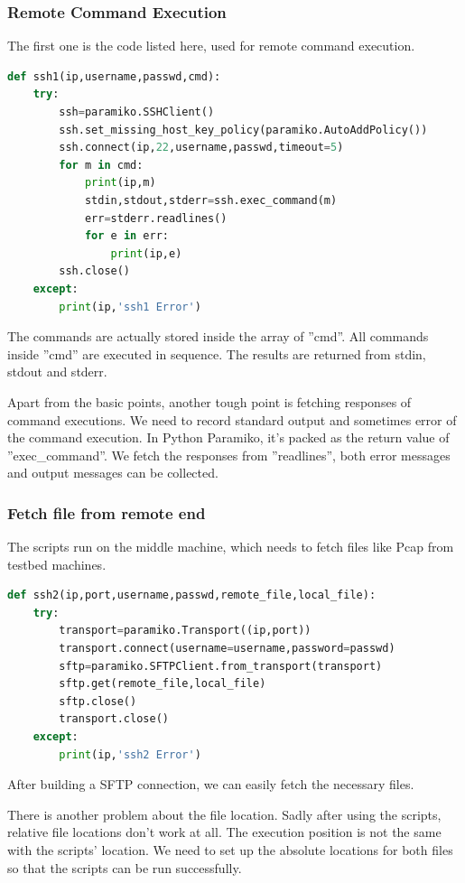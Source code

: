 \documentclass[12pt,a4paper]{article}
\begin{document}
\subsubsection{Remote Command Execution}
The first one is the code listed here, used for remote command execution.

\begin{lstlisting}[language=Python]
def ssh1(ip,username,passwd,cmd):
    try:
        ssh=paramiko.SSHClient()
        ssh.set_missing_host_key_policy(paramiko.AutoAddPolicy())
        ssh.connect(ip,22,username,passwd,timeout=5)
        for m in cmd:
            print(ip,m)
            stdin,stdout,stderr=ssh.exec_command(m)
            err=stderr.readlines()
            for e in err:
                print(ip,e)
        ssh.close()
    except:
        print(ip,'ssh1 Error')
\end{lstlisting}

The commands are actually stored inside the array of ''cmd''.
All commands inside ''cmd'' are executed in sequence.
The results are returned from stdin, stdout and stderr.

Apart from the basic points, another tough point is fetching responses of command executions.
We need to record standard output and sometimes error of the command execution.
In Python Paramiko, it's packed as the return value of ''exec\_command''.
We fetch the responses from ''readlines'', both error messages and output messages can be collected.

\subsubsection{Fetch file from remote end}
The scripts run on the middle machine, which needs to fetch files like Pcap from testbed machines.

\begin{lstlisting}[language=Python]
def ssh2(ip,port,username,passwd,remote_file,local_file):
    try:
        transport=paramiko.Transport((ip,port))
        transport.connect(username=username,password=passwd)
        sftp=paramiko.SFTPClient.from_transport(transport)
        sftp.get(remote_file,local_file)
        sftp.close()
        transport.close()
    except:
        print(ip,'ssh2 Error')
\end{lstlisting}

After building a SFTP connection, we can easily fetch the necessary files.

There is another problem about the file location.
Sadly after using the scripts, relative file locations don't work at all.
The execution position is not the same with the scripts' location.
We need to set up the absolute locations for both files so that the scripts can be run successfully.
\end{document}
